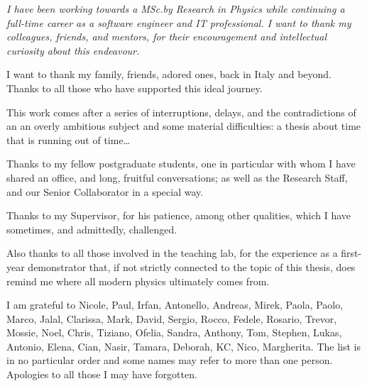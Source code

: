 {\it%
I have been working towards a MSc.\;by Research in Physics
while continuing a full-time career as a software engineer and IT professional. 
I want to thank my colleagues, friends, and mentors,
for their encouragement and intellectual curiosity about this endeavour. 

I want to thank my family, friends, adored ones, back in Italy and beyond.
Thanks to all those who have supported this ideal journey.

This work comes after a series of interruptions, delays,
and the contradictions of an
an overly ambitious subject and some material difficulties:
a thesis about time that is running out of time\dots

Thanks to my fellow postgraduate students, one in particular with whom I have shared
an office, and long, fruitful conversations;
as well as the Research Staff, and our Senior Collaborator in a special way. 

Thanks to my Supervisor, for his patience, among other qualities, which I have sometimes, and admittedly, challenged.

Also thanks to all those involved in the teaching lab, 
for the experience as a first-year demonstrator that, 
if not strictly connected to the topic of this thesis, 
does remind me where all modern physics ultimately comes from.

I am grateful to Nicole, Paul, Irfan, Antonello, Andreas, Mirek, Paola, Paolo, Marco,
Jalal, Clarissa, Mark, David, Sergio, Rocco, Fedele, Rosario, Trevor, Mossie, Noel, Chris, Tiziano, Ofelia,
Sandra, Anthony, Tom, Stephen, Lukas, Antonio, Elena, Cian, Nasir, Tamara, 
Deborah, KC, Nico, Margherita. The list is in no particular order and some names may refer to more than one person.
Apologies to all those I may have forgotten.
}
